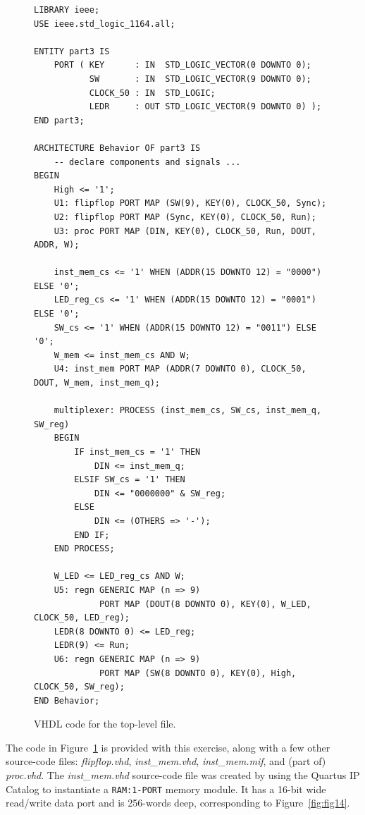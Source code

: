 \documentclass[epsfig,10pt,fullpage]{article} \addtolength{\textwidth}{1.5in}
\begin{document}
\lstset{language=VHDL,numbers=none,escapechar=|}
\begin{figure}[H]
\begin{center}
\begin{minipage}[H]{15 cm}
\begin{lstlisting}[name=proc]
LIBRARY ieee;
USE ieee.std_logic_1164.all;

ENTITY part3 IS 
    PORT ( KEY      : IN  STD_LOGIC_VECTOR(0 DOWNTO 0);
           SW       : IN  STD_LOGIC_VECTOR(9 DOWNTO 0);
           CLOCK_50 : IN  STD_LOGIC;
           LEDR     : OUT STD_LOGIC_VECTOR(9 DOWNTO 0) );
END part3;

ARCHITECTURE Behavior OF part3 IS
    -- declare components and signals ...
BEGIN
    High <= '1';
    U1: flipflop PORT MAP (SW(9), KEY(0), CLOCK_50, Sync);
    U2: flipflop PORT MAP (Sync, KEY(0), CLOCK_50, Run);
    U3: proc PORT MAP (DIN, KEY(0), CLOCK_50, Run, DOUT, ADDR, W);

    inst_mem_cs <= '1' WHEN (ADDR(15 DOWNTO 12) = "0000") ELSE '0';
    LED_reg_cs <= '1' WHEN (ADDR(15 DOWNTO 12) = "0001") ELSE '0';
    SW_cs <= '1' WHEN (ADDR(15 DOWNTO 12) = "0011") ELSE '0';
    W_mem <= inst_mem_cs AND W;
    U4: inst_mem PORT MAP (ADDR(7 DOWNTO 0), CLOCK_50, DOUT, W_mem, inst_mem_q);

    multiplexer: PROCESS (inst_mem_cs, SW_cs, inst_mem_q, SW_reg)
    BEGIN
        IF inst_mem_cs = '1' THEN
            DIN <= inst_mem_q;
        ELSIF SW_cs = '1' THEN
            DIN <= "0000000" & SW_reg;
        ELSE
            DIN <= (OTHERS => '-');
        END IF;
    END PROCESS;

    W_LED <= LED_reg_cs AND W;
    U5: regn GENERIC MAP (n => 9) 
             PORT MAP (DOUT(8 DOWNTO 0), KEY(0), W_LED, CLOCK_50, LED_reg);
    LEDR(8 DOWNTO 0) <= LED_reg;
    LEDR(9) <= Run;
    U6: regn GENERIC MAP (n => 9) 
             PORT MAP (SW(8 DOWNTO 0), KEY(0), High, CLOCK_50, SW_reg);
END Behavior;
\end{lstlisting}
\end{minipage}
\caption{VHDL code for the top-level file.}
\label{fig:top}
\end{center}
\end{figure}

\noindent
The code in Figure~\ref{fig:top} is provided with this exercise, along with a few
other source-code files: {\it flipflop.vhd}, {\it inst\_mem.vhd}, {\it inst\_mem.mif}, and 
(part of) {\it proc.vhd}. The {\it inst\_mem.vhd} source-code file was created 
by using the Quartus IP 
Catalog to instantiate a \texttt{RAM:1-PORT} memory module. It has a 16-bit wide read/write
data port and is 256-words deep, corresponding to Figure~\ref{fig:fig14}.
\end{document}
